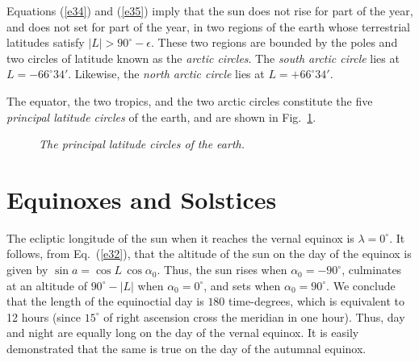 Equations (\ref{e34}) and (\ref{e35}) imply that the sun
does not rise for part of the year, and does not set for part of the year, 
in two regions of the earth whose terrestrial latitudes satisfy $|L|> 90^\circ - \epsilon$.
These two regions are bounded by the  poles and two circles of latitude
 known as the {\em arctic circles}. The
{\em south arctic circle}\/ lies at  $L=-66^\circ 34'$. Likewise,
the {\em north arctic circle}\/ lies at  $L=+66^\circ 34'$. 

The equator, the two tropics, and the two arctic circles constitute the
five {\em principal latitude circles}\/ of the earth, and are shown in Fig.~\ref{f10}.

\begin{figure}
\epsfysize=3in
\centerline{}
\caption[{\em The principal latitude circles of the earth.}]{\em The principal latitude circles of the earth.}\label{f10}
\end{figure}

\section{Equinoxes and Solstices}
The ecliptic longitude of the sun when it reaches the vernal equinox is $\lambda = 0^\circ$.
It follows, from Eq.~(\ref{e32}), that the altitude of the sun on the
day of the equinox is given by $\sin a = \cos L\,\cos \alpha_0$. Thus, the sun rises
when $\alpha_0=-90^\circ$, culminates at an altitude of $90^\circ - |L|$ when $\alpha_0 = 0^\circ$, and sets when
$\alpha_0=90^\circ$. We conclude that the length of the equinoctial day is $180$ time-degrees, which
is equivalent to 12 hours (since $15^\circ$ of right ascension cross the
meridian in one hour). 
Thus, day and night are equally long on the day of the vernal equinox. It is easily
demonstrated that the same is true on the day of the autumnal equinox. 

